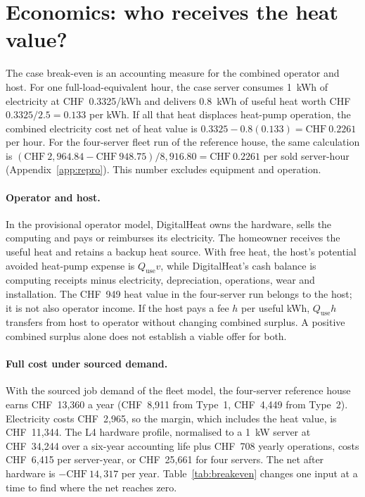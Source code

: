 \section{Economics: who receives the heat value?}
\label{sec:economics}

The case break-even is an accounting measure for the combined operator and host. For one
full-load-equivalent hour, the case server consumes \qty{1}{kWh} of electricity at
CHF~0.3325/kWh and delivers \qty{0.8}{kWh} of useful heat worth
CHF~$0.3325/2.5=0.133$ per kWh. If all that heat displaces heat-pump operation, the combined
electricity cost net of heat value is $0.3325-0.8(0.133)=\text{CHF}~0.2261$ per hour.
For the four-server fleet run of the reference house, the same calculation is
$(\text{CHF}~2{,}964.84-\text{CHF}~948.75)/8{,}916.80
=\text{CHF}~0.2261$ per sold server-hour
(Appendix~\ref{app:repro}). This number excludes equipment and operation.

\paragraph{Operator and host.} In the provisional operator model, DigitalHeat
owns the hardware, sells the computing and pays or reimburses its electricity. The homeowner
receives the useful heat and retains a backup heat source. With free heat, the host's potential
avoided heat-pump expense is $Q_{\mathrm{use}}v$, while DigitalHeat's cash balance is computing
receipts minus electricity, depreciation, operations, wear and installation. The CHF~949 heat
value in the four-server run belongs to the host; it is not also operator income. If the host pays
a fee $h$ per useful kWh, $Q_{\mathrm{use}}h$ transfers from host to operator without changing
combined surplus. A positive combined surplus alone does not establish a viable offer for both.

\paragraph{Full cost under sourced demand.} With the sourced job demand of the fleet model, the
four-server reference house earns CHF~13,360 a year (CHF~8,911 from Type~1, CHF~4,449 from
Type~2). Electricity costs CHF~2,965, so the margin, which includes the heat value, is CHF~11,344. The
L4 hardware profile, normalised to a \qty{1}{kW} server at CHF~34,244 over a six-year accounting
life plus CHF~708 yearly operations, costs CHF~6,415 per server-year, or CHF~25,661 for four
servers. The net after hardware is $-\text{CHF}~14{,}317$ per year. Table~\ref{tab:breakeven}
changes one input at a time to find where the net reaches zero.

